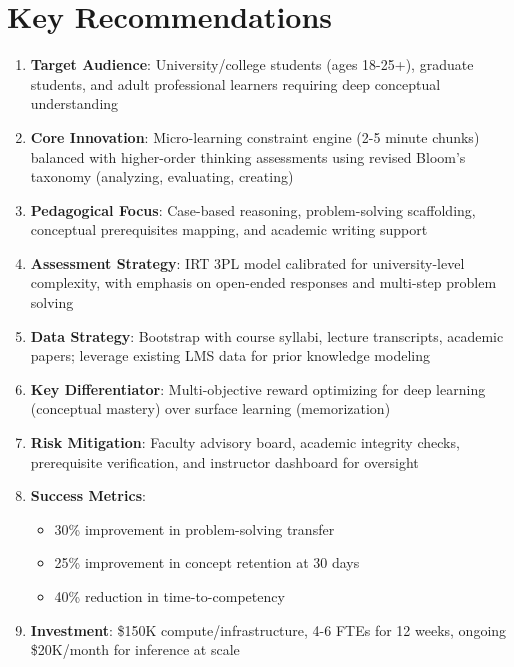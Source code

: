 \documentclass[11pt,a4paper]{report}
\begin{document}
\section{Key Recommendations}

\begin{enumerate}[leftmargin=*]
    \item \textbf{Target Audience}: University/college students (ages 18-25+), graduate students, and adult professional learners requiring deep conceptual understanding
    
    \item \textbf{Core Innovation}: Micro-learning constraint engine (2-5 minute chunks) balanced with higher-order thinking assessments using revised Bloom's taxonomy (analyzing, evaluating, creating)
    
    \item \textbf{Pedagogical Focus}: Case-based reasoning, problem-solving scaffolding, conceptual prerequisites mapping, and academic writing support
    
    \item \textbf{Assessment Strategy}: IRT 3PL model calibrated for university-level complexity, with emphasis on open-ended responses and multi-step problem solving
    
    \item \textbf{Data Strategy}: Bootstrap with course syllabi, lecture transcripts, academic papers; leverage existing LMS data for prior knowledge modeling
    
    \item \textbf{Key Differentiator}: Multi-objective reward optimizing for deep learning (conceptual mastery) over surface learning (memorization)
    
    \item \textbf{Risk Mitigation}: Faculty advisory board, academic integrity checks, prerequisite verification, and instructor dashboard for oversight
    
    \item \textbf{Success Metrics}: 
    \begin{itemize}
        \item 30\% improvement in problem-solving transfer
        \item 25\% improvement in concept retention at 30 days
        \item 40\% reduction in time-to-competency
    \end{itemize}
    
    \item \textbf{Investment}: \$150K compute/infrastructure, 4-6 FTEs for 12 weeks, ongoing \$20K/month for inference at scale
\end{enumerate}
\end{document}
